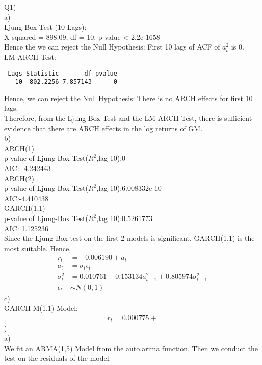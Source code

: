 \documentclass[12pt]{article}
\begin{document}
Q1)\\
\bigskip
a)\\
\bigskip
Ljung-Box Test (10 Lags):\\
X-squared = 898.09, df = 10, p-value < 2.2e-1658\\
Hence the we can reject the Null Hypothesis: First 10 lags of ACF of ${a_{t}^{2}}$ is 0.\\
LM ARCH Test:\\
\begingroup
\fontsize{12pt}{10pt}\selectfont
\begin{verbatim}
 Lags Statistic       df pvalue
   10  802.2256 7.857143      0
\end{verbatim} 
\endgroup
Hence, we can reject the Null Hypothesis: There is no ARCH effects for first 10 lags.\\
\bigskip
Therefore, from the Ljung-Box Test and the LM ARCH Test, there is sufficient evidence that there are ARCH effects in the log returns of GM.\\
\bigskip
b)\\
\bigskip
ARCH(1)\\
p-value of Ljung-Box Test($R^2$,lag 10):0 \\
AIC: -4.242443\\
\bigskip
ARCH(2)\\
p-value of Ljung-Box Test($R^2$,lag 10):6.008332e-10\\
AIC:-4.410438\\
\bigskip
GARCH(1,1)\\
p-value of Ljung-Box Test($R^2$,lag 10):0.5261773\\
AIC: 1.125236\\ 
\bigskip
Since the Ljung-Box test on the first 2 models is significant, GARCH(1,1) is the most suitable. Hence,
\begin{equation*}
\begin{split}
r_{t} &= -0.006190+a_{t} \\
a_{t} &= \sigma_{t} \epsilon_{t}\\
\sigma_{t}^{2} &= 0.010761+0.153134a_{t-1}^{2}+0.805974\sigma_{t-1}^{2}\\
\epsilon_{t} &\sim N(0,1)
\end{split}
\end{equation*}
c)\\
\bigskip
GARCH-M(1,1) Model:
\begin{equation*}
\begin{split}
r_{t} =  0.000775 + 
\end{split}
\end{equation*}
)\\
\bigskip
a)\\
\bigskip
We fit an ARMA(1,5) Model from the auto.arima function. Then we conduct the test on the residuals of the model:
\end{document}
